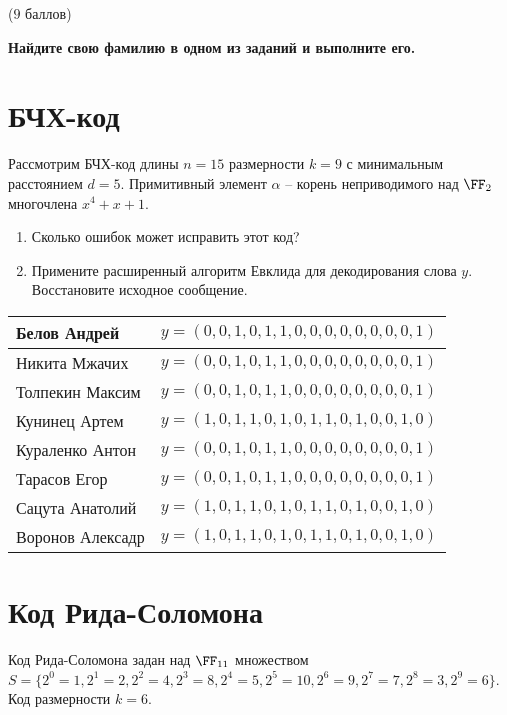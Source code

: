 \documentclass[12pt,a4paper]{scrartcl}
\newcounter{auf}
\newcommand{\auf}[2]
{
\stepcounter{auf}{\textbf{Задание} \textbf{\arabic{auf}} } ({#1} баллов) \vspace{3pt}

#2

\newpage %
}
\begin{document}
\auf{$9$}{%
	
\textbf{Найдите свою фамилию в одном из заданий и выполните его.}

\section{БЧХ-код}
	
Рассмотрим БЧХ-код длины $n=15$ размерности $k=9$ с минимальным расстоянием $d=5$. %
Примитивный элемент $\alpha$ -- корень неприводимого над $\FF_2$ многочлена $x^4+x+1$.\\

\begin{enumerate}
	\item Сколько ошибок может исправить этот код?
	\item Примените расширенный алгоритм Евклида для декодирования слова $y$. Восстановите исходное сообщение.
\end{enumerate}


\def\arraystretch{1.5}
\setlength{\tabcolsep}{15pt}
\begin{tabular}{l  | c }
	Белов Андрей   & $y=(0, 0, 1, 0, 1, 1, 0, 0, 0, 0, 0, 0, 0, 0, 1)$\\ \hline
	Никита Мжачих  &  $y=(0, 0, 1, 0, 1, 1, 0, 0, 0, 0, 0, 0, 0, 0, 1)$\\  \hline
	Толпекин Максим&  $y=(0, 0, 1, 0, 1, 1, 0, 0, 0, 0, 0, 0, 0, 0, 1)$\\  \hline
	Кунинец Артем  & $y = (1, 0, 1, 1, 0, 1, 0, 1, 1, 0, 1, 0, 0, 1, 0)$\\  \hline
	Кураленко Антон & $y=(0, 0, 1, 0, 1, 1, 0, 0, 0, 0, 0, 0, 0, 0, 1)$ \\  \hline
	Тарасов Егор &  $y=(0, 0, 1, 0, 1, 1, 0, 0, 0, 0, 0, 0, 0, 0, 1)$\\  \hline
	Сацута Анатолий & $y = (1, 0, 1, 1, 0, 1, 0, 1, 1, 0, 1, 0, 0, 1, 0)$ \\  \hline
	Воронов Алексадр & $y=(1, 0, 1, 1, 0, 1, 0, 1, 1, 0, 1, 0, 0, 1, 0)$\\  \hline
\end{tabular}

\section{Код Рида-Соломона}

Код Рида-Соломона задан над $\FF_{11}$ множеством $S = \{ 2^0 = 1, 2^1 = 2, 2^2 = 4, 2^3 = 8, 2^4 = 5, 2^5 =10 , 2^6 = 9, 2^7 = 7, 2^8 =3 , 2^9 = 6   \}$. Код размерности $k=6$.

}
\end{document}
